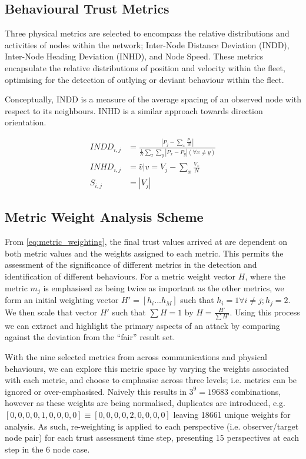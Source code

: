 \subsection{Behavioural Trust Metrics}

Three physical metrics are selected to encompass the relative distributions and activities of nodes within the network; Inter-Node Distance Deviation (INDD), Inter-Node Heading Deviation (INHD), and Node Speed. These metrics encapsulate the relative distributions of position and velocity within the fleet, optimising for the detection of outlying or deviant behaviour within the fleet.

Conceptually, INDD is a measure of the average spacing of an observed node with respect to its neighbours. INHD is a similar approach towards direction orientation.

\begin{align}
	INDD_{i,j} &= \frac{|P_j - \sum_x \frac{P_x}{N}|}{\frac{1}{N}\sum_x \sum_y{|P_x - P_y| (\forall x \neq y)}}\\
	INHD_{i,j} &= \hat{v} \vert v= V_j - \sum_x{\frac{V_x}{N}}\\
	S_{i,j} &= |V_j|
\end{align}

\subsection{Metric Weight Analysis Scheme}

From \eqref{eq:metric_weighting}, the final trust values arrived at are dependent on both metric values and the weights assigned to each metric. This permits the assessment of the significance of different metrics in the detection and identification of different behaviours. 
For a metric weight vector $H$, where the metric $m_j$ is emphasised as being twice as important as the other metrics, we form an initial weighting vector $H'=[h_i...h_M]$ such that $h_i = 1 \forall i \ne j; h_j=2$. We then scale that vector $H'$ such that $\sum H = 1$ by $H= \frac{H'}{\sum H'}$.
Using this process we can extract and highlight the primary aspects of an attack by comparing against the deviation from the ``fair'' result set.

With the nine selected metrics from across communications and physical behaviours, we can explore this metric space by varying the weights associated with each metric, and choose to emphasise across three levels; i.e. metrics can be ignored or over-emphasised. Naively this results in $3^9 = 19683$ combinations, however as these weights are being normalised, duplicates are introduced, e.g. $[0,0,0,0,1,0,0,0,0] \equiv [0,0,0,0,2,0,0,0,0]$ leaving 18661 unique weights for analysis.
As such, re-weighting is applied to each perspective (i.e. observer/target node pair) for each trust assessment time step, presenting 15 perspectives at each step in the 6 node case.

